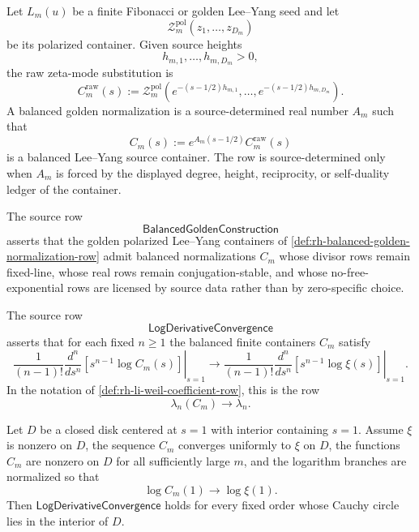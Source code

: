 \begin{definition}
\label{def:rh-balanced-golden-normalization-row}
Let $L_m(u)$ be a finite Fibonacci or golden Lee--Yang seed and let
$$
\mathcal Z_m^{\mathrm{pol}}(z_1,\ldots,z_{D_m})
$$
be its polarized container.  Given source heights
$$
h_{m,1},\ldots,h_{m,D_m}>0,
$$
the raw zeta-mode substitution is
$$
C_m^{\mathrm{raw}}(s)
:=
\mathcal Z_m^{\mathrm{pol}}
\left(
e^{-(s-1/2)h_{m,1}},
\ldots,
e^{-(s-1/2)h_{m,D_m}}
\right).
$$
A balanced golden normalization is a source-determined real number
$A_m$ such that
$$
C_m(s)
:=
e^{A_m(s-1/2)}C_m^{\mathrm{raw}}(s)
$$
is a balanced Lee--Yang source container.  The row is source-determined
only when $A_m$ is forced by the displayed degree, height, reciprocity,
or self-duality ledger of the container.
\end{definition}

\begin{definition}
\label{def:rh-balanced-golden-construction}
The source row
$$
\mathsf{BalancedGoldenConstruction}
$$
asserts that the golden polarized Lee--Yang containers of
\autoref{def:rh-balanced-golden-normalization-row} admit balanced
normalizations $C_m$ whose divisor rows remain fixed-line, whose real
rows remain conjugation-stable, and whose no-free-exponential rows are
licensed by source data rather than by zero-specific choice.
\end{definition}

\begin{definition}
\label{def:rh-log-derivative-convergence}
The source row
$$
\mathsf{LogDerivativeConvergence}
$$
asserts that for each fixed $n\ge1$ the balanced finite containers
$C_m$ satisfy
$$
\frac{1}{(n-1)!}
\left.
\frac{d^n}{ds^n}
\left[
s^{n-1}\log C_m(s)
\right]
\right|_{s=1}
\longrightarrow
\frac{1}{(n-1)!}
\left.
\frac{d^n}{ds^n}
\left[
s^{n-1}\log \xi(s)
\right]
\right|_{s=1}.
$$
In the notation of
\autoref{def:rh-li-weil-coefficient-row}, this is the row
$$
\lambda_n(C_m)\to\lambda_n.
$$
\end{definition}

\begin{theorem}
\label{thm:rh-local-analytic-condition-log-derivative-convergence}
Let $D$ be a closed disk centered at $s=1$ with interior containing
$s=1$.  Assume $\xi$ is nonzero on $D$, the sequence $C_m$ converges
uniformly to $\xi$ on $D$, the functions $C_m$ are nonzero on $D$ for
all sufficiently large $m$, and the logarithm branches are normalized
so that
$$
\log C_m(1)\to\log \xi(1).
$$
Then $\mathsf{LogDerivativeConvergence}$ holds for every fixed order
whose Cauchy circle lies in the interior of $D$.
\end{theorem}


